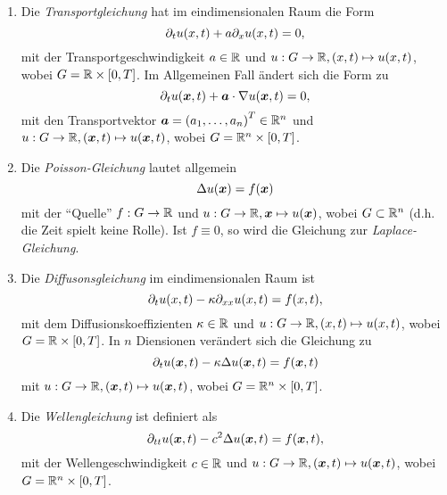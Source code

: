 \documentclass{lecture}
\begin{document}
    \begin{example}
        \begin{enumerate}
            \item Die \emph{Transportgleichung} hat im eindimensionalen Raum die Form
            \[
                \partial_t u\parentheses*{x, t} + a\partial_x u\parentheses*{x, t} = 0,
            \]
            mit der Transportgeschwindigkeit \(a \in \R\) und \(u: G \to \R, \parentheses*{x, t} \mapsto u\parentheses*{x, t}\), wobei \(G = \R \times \brackets*{0, T}\).
            Im Allgemeinen Fall ändert sich die Form zu
            \[
                \partial_t u\parentheses*{\bm{x}, t} + \bm{a} \cdot \nabla u\parentheses*{\bm{x}, t} = 0,
            \]
            mit den Transportvektor \(\bm{a} = \parentheses*{a_1, \ldots, a_n}^T \in \R^n\) und \(u: G \to \R, \parentheses*{\bm{x}, t} \mapsto u\parentheses*{\bm{x}, t}\), wobei \(G = \R^n \times \brackets*{0, T}\).
            \item Die \emph{Poisson-Gleichung} lautet allgemein
            \[
                \Delta u\parentheses*{\bm{x}} = f\parentheses*{\bm{x}}
            \]
            mit der ``Quelle'' \(f: G \to \R\) und \(u: G \to \R, \bm{x} \mapsto u\parentheses*{\bm{x}}\), wobei \(G \subset \R^n\) (d.h. die Zeit spielt keine Rolle).
            Ist \(f \equiv 0\), so wird die Gleichung zur \emph{Laplace-Gleichung}.
            \item Die \emph{Diffusonsgleichung} im eindimensionalen Raum ist
            \[
                \partial_t u\parentheses*{x, t} - \kappa\partial_{xx}u\parentheses*{x, t} = f\parentheses*{x, t},
            \]
            mit dem Diffusionskoeffizienten \(\kappa \in \R\) und \(u: G \to \R, \parentheses*{x, t} \mapsto u\parentheses*{x, t}\), wobei \(G = \R \times \brackets*{0, T}\).
            In \(n\) Diensionen verändert sich die Gleichung zu
            \[
                \partial_t u\parentheses*{\bm{x}, t} - \kappa\Delta u\parentheses*{\bm{x}, t} = f\parentheses*{\bm{x}, t}
            \]
            mit \(u: G \to \R, \parentheses*{\bm{x}, t} \mapsto u\parentheses*{\bm{x}, t}\), wobei \(G = \R^n \times \brackets*{0, T}\).
            \item Die \emph{Wellengleichung} ist definiert als
            \[\partial_{tt}u\parentheses*{\bm{x}, t} - c^2 \Delta u\parentheses*{\bm{x}, t} = f\parentheses*{\bm{x}, t},\]
            mit der Wellengeschwindigkeit \(c \in \R\) und \(u: G \to \R, \parentheses*{\bm{x}, t} \mapsto u\parentheses*{\bm{x}, t}\), wobei \(G = \R^n \times \brackets*{0, T}\).

\end{enumerate}
\end{example}
\end{document}
